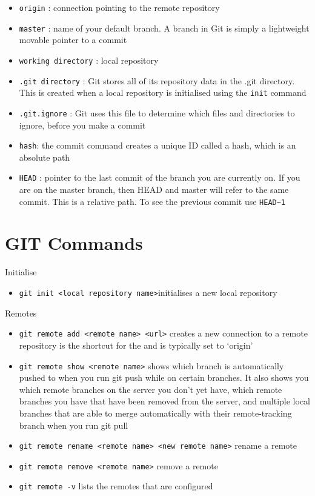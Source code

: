 \documentclass[
  12pt,
]{book}
\providecommand{\tightlist}{%
  \setlength{\itemsep}{0pt}\setlength{\parskip}{0pt}}
\begin{document}
\begin{itemize}
\item
  \texttt{origin} : connection pointing to the remote repository
\item
  \texttt{master} : name of your default branch. A branch in Git is simply a lightweight movable pointer to a commit
\item
  \texttt{working\ directory} : local repository
\item
  \texttt{.git\ directory} : Git stores all of its repository data in the .git directory. This is created when a local repository is initialised using the \texttt{init} command
\item
  \texttt{.git.ignore} : Git uses this file to determine which files and directories to ignore, before you make a commit
\item
  \texttt{hash}: the commit command creates a unique ID called a hash, which is an absolute path
\item
  \texttt{HEAD} : pointer to the last commit of the branch you are currently on. If you are on the master branch, then HEAD and master will refer to the same commit. This is a relative path. To see the previous commit use \texttt{HEAD\textasciitilde{}1}
\end{itemize}

\hypertarget{git-commands-1}{%
\section{GIT Commands}\label{git-commands-1}}

Initialise

\begin{itemize}
\tightlist
\item
  \texttt{git\ init\ \textless{}local\ repository\ name\textgreater{}}initialises a new local repository
\end{itemize}

Remotes

\begin{itemize}
\tightlist
\item
  \texttt{git\ remote\ add\ \textless{}remote\ name\textgreater{}\ \textless{}url\textgreater{}} creates a new connection to a remote repository is the shortcut for the and is typically set to `origin'
\item
  \texttt{git\ remote\ show\ \textless{}remote\ name\textgreater{}} shows which branch is automatically pushed to when you run git push while on certain branches. It also shows you which remote branches on the server you don't yet have, which remote branches you have that have been removed from the server, and multiple local branches that are able to merge automatically with their remote-tracking branch when you run git pull
\item
  \texttt{git\ remote\ rename\ \textless{}remote\ name\textgreater{}\ \textless{}new\ remote\ name\textgreater{}} rename a remote
\item
  \texttt{git\ remote\ remove\ \textless{}remote\ name\textgreater{}} remove a remote
\item
  \texttt{git\ remote\ -v} lists the remotes that are configured
\end{itemize}
\end{document}
